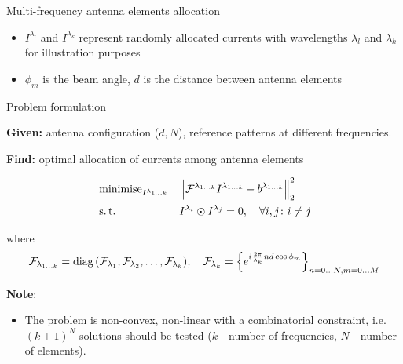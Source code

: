 \documentclass[../main.tex]{subfiles}
\begin{document}
\begin{frame}[t]{Multi-frequency antenna elements allocation}
\begin{figure}[H]
\end{figure}

\begin{itemize}
	\item $I^{\lambda_{l}}$ and $I^{\lambda_{k}}$ represent randomly allocated currents with wavelengths $\lambda_l$ and $\lambda_k$ for illustration purposes
	\item $\phi_{m}$ is the beam angle, $d$ is the distance between antenna elements
\end{itemize}

\end{frame}


%
%

\begin{frame}[t]{Problem formulation}

\textbf{Given:} antenna configuration ($d, N$), reference patterns at different frequencies.

\textbf{Find:} optimal allocation of currents among antenna elements
    
\begin{equation*}
\begin{aligned}
& \operatorname{minimise}_{I^{\lambda_{1\ldots k}}} 
& & \Big\| \mathcal{F}^{\lambda_{1 \ldots k}} I^{\lambda_{1\ldots k}} - b^{\lambda_{1 \ldots k}} \Big\|_2^2 \\
& \operatorname{s.t.}
& & I^{\lambda_i} \odot I^{\lambda_j} = 0, \quad \forall i, j \colon i \ne j \\
\end{aligned}
\end{equation*}

where 
\begin{equation*}
  \mathcal{F}_{\lambda_{1 \ldots k}} = \operatorname{diag}{(\mathcal{F}_{\lambda_1}, \mathcal{F}_{\lambda_2}, \ldots, \mathcal{F}_{\lambda_k})}, \quad \mathcal{F}_{\lambda_{k}} = \Big\{ e^{i \frac{2\pi}{\lambda_k}n d \cos{\phi_m}} \Big\}_{n=0\ldots N, m = 0\ldots M}
\end{equation*}

\textbf{Note}: 
\begin{itemize}
    \item The problem is non-convex, non-linear with a combinatorial constraint, i.e. $(k+1)^N$ solutions should be tested ($k$ - number of frequencies, $N$ - number of elements).
\end{itemize}

\end{frame}
\end{document}
